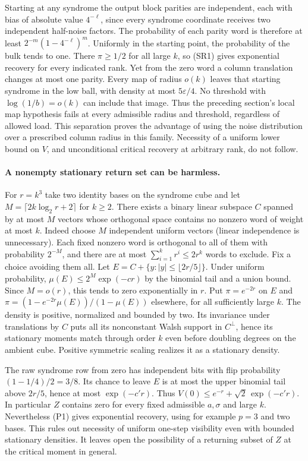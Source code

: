 Starting at any syndrome the output block parities are independent, each
with bias of absolute value $4^{-\ell}$, since every syndrome coordinate
receives two independent half-noise factors. The probability of each
parity word is therefore at least $2^{-m}(1-4^{-\ell})^m$.
Uniformly in the starting point, the probability of the bulk tends to
one. There $\pi\ge1/2$ for all large $k$, so (SR1) gives exponential
recovery for every indicated rank. Yet from the zero word a column
translation changes at most one parity. Every map of radius $o(k)$
leaves that starting syndrome in the low ball, with density at most
$5\varepsilon/4$. No threshold with $\log(1/b)=o(k)$ can include
that image. Thus the preceding section's local map hypothesis fails
at every admissible radius and threshold, regardless of allowed load.
This separation proves the advantage of using the noise distribution
over a prescribed column radius in this family. Necessity of a
uniform lower bound on $V$, and unconditional critical recovery at
arbitrary rank, do not follow.

\paragraph{A nonempty stationary return set can be harmless.}
For $r=k^3$ take two identity bases on the syndrome cube and let
$M=\lceil 2k\log_2 r+2\rceil$ for $k\ge2$. There exists a binary linear
subspace $C$ spanned by at most $M$ vectors whose orthogonal space contains
no nonzero word of weight at most $k$. Indeed choose $M$ independent uniform
vectors (linear independence is unnecessary). Each fixed nonzero word is
orthogonal to all of them with probability $2^{-M}$, and there are at most
$\sum_{i=1}^k r^i\le 2r^k$ words to exclude. Fix a choice avoiding them all.
Let $E=C+\{y:|y|\le\lfloor 2r/5\rfloor\}$. Under uniform probability,
$\mu(E)\le 2^M\exp(-c r)$ by the binomial tail and a union bound.
Since $M=o(r)$, this tends to zero exponentially in $r$. Put
$\pi=e^{-2r}$ on $E$ and $\pi=(1-e^{-2r}\mu(E))/(1-\mu(E))$ elsewhere,
for all sufficiently large $k$. The density is positive, normalized and
bounded by two. Its invariance under translations by $C$ puts all its
nonconstant Walsh support in $C^\perp$, hence its stationary moments match
through order $k$ even before doubling degrees on the ambient cube.
Positive symmetric scaling realizes it as a stationary density.

The raw syndrome row from zero has independent bits with flip probability
$(1-1/4)/2=3/8$. Its chance to leave $E$ is at most the upper binomial tail
above $2r/5$, hence at most $\exp(-c' r)$. Thus
$V(0)\le e^{-r}+\sqrt2\,\exp(-c'r)$. In particular $Z$ contains zero
for every fixed admissible $a,\sigma$ and large $k$. Nevertheless (P1)
gives exponential recovery, using for example $p=3$ and two bases.
This rules out necessity of uniform one-step visibility even with bounded
stationary densities. It leaves open the possibility of a returning subset
of $Z$ at the critical moment in general.

